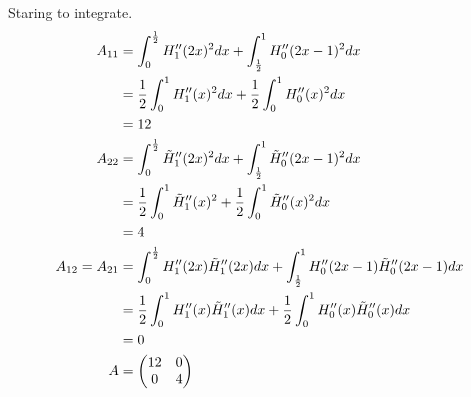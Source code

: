 \documentclass[aps, 12pt]{revtex4}
\begin{document}
Staring to integrate.
\begin{align*}
    A_{11}          & = \int_0^{\frac{1}{2}} H_1''(2x)^2dx + \int_{\frac{1}{2}}^1 H_0''(2x-1)^2dx
    \\
                    & = \frac{1}{2}\int_0^1 H_1''(x)^2dx + \frac{1}{2}\int_0^1 H_0''(x)^2dx
    \\
                    & =12
    \\
    A_{22}          & = \int_0^{\frac{1}{2}} \tilde{H}_1''(2x)^2dx + \int_{\frac{1}{2}}^1 \tilde{H}_0''(2x-1)^2dx
    \\
                    & = \frac{1}{2}\int_0^1 \tilde{H}_1''(x)^2 + \frac{1}{2}\int_0^1 \tilde{H}_0''(x)^2dx
    \\
                    & = 4
    \\
    A_{12} = A_{21} & = \int_0^{\frac{1}{2}} H_1''(2x)\tilde{H}_1''(2x)dx + \int_{\frac{1}{2}}^1 H_0''(2x-1)\tilde{H}_0''(2x-1) dx
    \\
                    & = \frac{1}{2}\int_0^1 H_1''(x)\tilde{H}_1''(x)dx +\frac{1}{2}\int_0^1 H_0''(x)\tilde{H}_0''(x)dx
    \\
                    & = 0
    \\
    A               & =\begin{pmatrix}
        12 & 0 \\ 0 & 4
    \end{pmatrix}
\end{align*}
\end{document}
